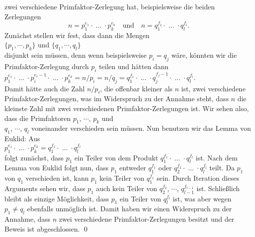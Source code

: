 zwei verschiedene Primfaktor-Zerlegung hat, beispielsweise die beiden Zerlegungen
\begin{equation}
  \label{eq:hauptsatz-arithmetik1}
n = p_1^{e_1} \cdot \;\dots\; \cdot p_k^{e_k} \quad \mbox{und} \quad
n = q_1^{f_1} \cdot \;\dots\; \cdot q_l^{f_l}.  
\end{equation}
Zunächst stellen wir fest, dass dann die Mengen
\\[0.2cm]
\hspace*{1.3cm}
$\{p_1, \cdots, p_k\}$ \quad und \quad
$\{q_1, \cdots, q_l\}$ 
\\[0.2cm]
disjunkt sein müssen, denn wenn beispielsweise $p_i = q_j$ wäre, könnten wir die
Primfaktor-Zerlegung durch $p_i$ teilen und hätten dann
\\[0.2cm]
\hspace*{1.3cm}
$p_1^{e_1} \cdot \;\dots\; \cdot p_i^{e_i-1} \cdot \;\dots\; \cdot p_k^{e_k} = n/p_i = n/q_j
 = q_1^{f_1} \cdot \;\dots\; \cdot q_j^{f_j-1} \cdot \;\dots\; \cdot q_l^{f_l}$.
\\[0.2cm]
Damit hätte auch die Zahl $n/p_i$, die offenbar kleiner als $n$ ist, zwei verschiedene
Primfaktor-Zerlegungen, was im Widerspruch zu 
der Annahme steht, dass $n$ die kleinste Zahl mit zwei verschiedenen Primfaktor-Zerlegungen ist.
Wir sehen also, dass die Primfaktoren $p_1$, $\cdots$, $p_k$ und \\ $q_1$, $\cdots$, $q_l$ 
voneinander verschieden sein müssen.  Nun benutzen wir das Lemma von Euklid:  
Aus 
\\[0.2cm]
\hspace*{1.3cm}
$p_1^{e_1} \cdot \;\dots\; \cdot p_k^{e_k} = q_1^{f_1} \cdot \;\dots\; \cdot q_l^{f_l}$
\\[0.2cm]
folgt zunächst, dass $p_1$ ein Teiler von dem Produkt $q_1^{f_1} \cdot \;\dots\; \cdot q_l^{f_l}$ ist.
Nach dem Lemma von Euklid folgt nun, dass $p_1$ entweder $q_1^{f_1}$ oder 
$q_2^{f_2} \cdot \;\dots\; \cdot q_l^{f_l}$ teilt.  Da $p_1$ von $q_1$ verschieden ist, kann $p_1$ kein
Teiler von $q_1^{f_1}$ sein.  Durch Iteration dieses Arguments sehen wir, dass $p_1$ auch kein
Teiler von $q_2^{f_2}$, $\cdots$, $q_{l-1}^{f_{l-1}}$ ist.  Schließlich bleibt als einzige
Möglichkeit,  dass $p_1$ ein Teiler von
 $q_l^{f_l}$ ist, was aber wegen $p_1 \not= q_l$ ebenfalls unmöglich ist.
Damit haben wir einen Widerspruch zu der Annahme, dass $n$
zwei verschiedene Primfaktor-Zerlegungen besitzt und der Beweis ist abgeschlossen.
\qed
\pagebreak

